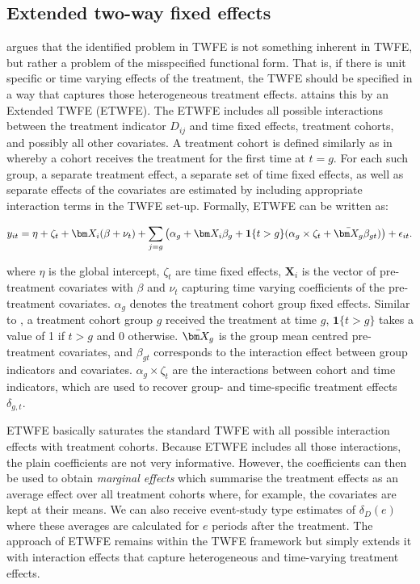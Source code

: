 \subsection{Extended two-way fixed effects}

\textcite{Wooldridge.2021} argues that the identified problem in TWFE is not something inherent in TWFE, but rather a problem of the misspecified functional form. That is, if there is unit specific or time varying effects of the treatment, the TWFE should be specified in a way that captures those heterogeneous treatment effects. \textcite{Wooldridge.2021} attains this by an Extended TWFE (ETWFE). The ETWFE includes all possible interactions between the treatment indicator $D_{ij}$ and time fixed effects, treatment cohorts, and possibly all other covariates. A treatment cohort is defined similarly as in \textcite{Callaway.2020} whereby a cohort receives the treatment for the first time at $t = g$.  For each such group, a separate treatment effect, a separate set of time fixed effects, as well as separate effects of the covariates are estimated by including appropriate interaction terms in the TWFE set-up. Formally, ETWFE can be written as:

\begin{equation}
\label{eq:etwfe}
y_{it} = \eta + \zeta_t + \bm X_i(\beta + \nu_t) + \sum_{j=g} \left( \alpha_g + \bm X_i \beta_g + \mathbf{1}\{t > g\}(\alpha_g \times \zeta_t + \Bar{\bm X_g}\beta_{gt})  \right)  + \epsilon_{it}.
\end{equation}

\noindent where $\eta$ is the global intercept, $\zeta_t$ are time fixed effects, $\bm X_i$ is the vector of pre-treatment covariates with $\beta$ and $\nu_t$ capturing time varying coefficients of the pre-treatment covariates. $\alpha_g$ denotes the treatment cohort group fixed effects. Similar to \textcite{Callaway.2020}, a treatment cohort group $g$ received the treatment at time $g$, $\mathbf{1}\{t > g\}$ takes a value of 1 if $t > g$ and 0 otherwise. $\Bar{\bm X_g}$ is the group mean centred pre-treatment covariates, and $\beta_{gt}$ corresponds to the interaction effect between group indicators and covariates. $\alpha_g \times \zeta_t$ are the interactions between cohort and time indicators, which are used to recover group- and time-specific treatment effects $\delta_{g,t}$. 

ETWFE basically saturates the standard TWFE with all possible interaction effects with treatment cohorts. Because ETWFE includes all those interactions, the plain coefficients are not very informative. However, the coefficients can then be used to obtain \emph{marginal effects} which summarise the treatment effects as an average effect over all treatment cohorts where, for example, the covariates are kept at their means. We can also receive event-study type estimates of $\delta_D(e)$ where these averages are calculated for $e$ periods after the treatment. The approach of ETWFE \cite{Wooldridge.2021} remains within the TWFE framework but simply extends it with interaction effects that capture heterogeneous and time-varying treatment effects.


